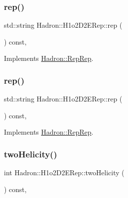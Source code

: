 \subsubsection{\texorpdfstring{rep()}{rep()}\hspace{0.1cm}{\footnotesize\ttfamily [4/5]}}
{\footnotesize\ttfamily std\+::string Hadron\+::\+H1o2\+D2\+E\+Rep\+::rep (\begin{DoxyParamCaption}{ }\end{DoxyParamCaption}) const\hspace{0.3cm}{\ttfamily [inline]}, {\ttfamily [virtual]}}



Implements \mbox{\hyperlink{structHadron_1_1RepRep_ab3213025f6de249f7095892109575fde}{Hadron\+::\+Rep\+Rep}}.

\mbox{\label{structHadron_1_1H1o2D2ERep_ac801e3e5c50b7740398e08b907cae155}} 
\subsubsection{\texorpdfstring{rep()}{rep()}\hspace{0.1cm}{\footnotesize\ttfamily [5/5]}}
{\footnotesize\ttfamily std\+::string Hadron\+::\+H1o2\+D2\+E\+Rep\+::rep (\begin{DoxyParamCaption}{ }\end{DoxyParamCaption}) const\hspace{0.3cm}{\ttfamily [inline]}, {\ttfamily [virtual]}}



Implements \mbox{\hyperlink{structHadron_1_1RepRep_ab3213025f6de249f7095892109575fde}{Hadron\+::\+Rep\+Rep}}.

\mbox{\label{structHadron_1_1H1o2D2ERep_a77a9c97dc4d7a120053dfb21794122ef}} 
\subsubsection{\texorpdfstring{twoHelicity()}{twoHelicity()}\hspace{0.1cm}{\footnotesize\ttfamily [1/3]}}
{\footnotesize\ttfamily int Hadron\+::\+H1o2\+D2\+E\+Rep\+::two\+Helicity (\begin{DoxyParamCaption}{ }\end{DoxyParamCaption}) const\hspace{0.3cm}{\ttfamily [inline]}, {\ttfamily [virtual]}}

